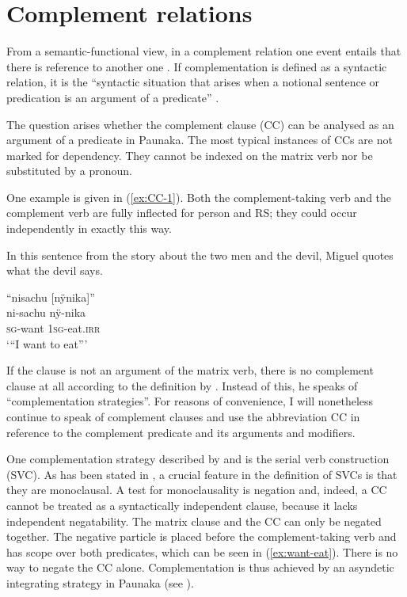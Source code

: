 

\section{Complement relations}\label{sec:ComplementClauses}

From a semantic-functional view, in a complement relation one event entails that there is reference to another one \citep[95]{Cristofaro2003}. If complementation is defined as a syntactic relation, it is the “syntactic situation that arises when a notional sentence or predication is an argument of a predicate” \citep[52]{Noonan2007}.

The question arises whether the complement clause (CC) can be analysed as an argument  of a predicate in Paunaka. The most typical instances of CCs are not marked for dependency. They cannot be indexed on the matrix verb nor be substituted by a pronoun. 

One example is given in (\ref{ex:CC-1}). Both the complement-taking verb and the complement verb are fully inflected for person and RS; they could occur independently in exactly this way.

In this sentence from the story about the two men and the devil, Miguel quotes what the devil says.

\ea\label{ex:CC-1}
\begingl
\glpreamble “nisachu \textup{[}nÿnika\textup{]}”\\
\gla ni-sachu nÿ-nika\\
\textsc{sg}-want 1\textsc{sg}-eat.\textsc{irr}\\
\glft ‘“I want to eat”’
\endgl
\trailingcitation{[mxx-n101017s-1.035]}
\xe

If the clause is not an argument of the matrix verb, there is no complement clause at all according to the definition by \citet{Dixon2006}. Instead of this, he speaks of “complementation strategies”. For reasons of convenience, I will nonetheless continue to speak of complement clauses and use the abbreviation CC in reference to the complement predicate and its arguments and modifiers.

One complementation strategy described by \citet[34--35]{Dixon2006} and \citet[87--92]{Noonan2007} is the serial verb construction (SVC). As has been stated in , a crucial feature in the definition of SVCs is that they are monoclausal. A test for monoclausality is negation and, indeed, a CC cannot be treated as a syntactically independent clause, because it lacks independent negatability. The matrix clause and the CC can only be negated together. The negative particle is placed before the complement-taking verb and has scope over both predicates, which can be seen in (\ref{ex:want-eat}). There is no way to negate the CC alone. Complementation is thus achieved by an asyndetic integrating strategy in Paunaka (see ).


